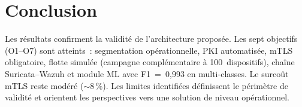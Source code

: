 \section{Conclusion}
\label{sec:tc-synthese}

Les résultats confirment la validité de l'architecture proposée. Les sept objectifs (O1--O7) sont atteints~: segmentation opérationnelle, PKI automatisée, mTLS obligatoire, flotte simulée (campagne complémentaire à 100~dispositifs), chaîne Suricata--Wazuh et module ML avec F1~=~0{,}993 en multi-classes. Le surcoût mTLS reste modéré ($\sim 8$\,\%). Les limites identifiées définissent le périmètre de validité et orientent les perspectives vers une solution de niveau opérationnel.
